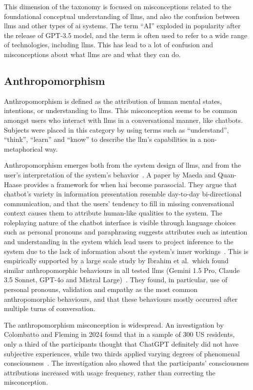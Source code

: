 This dimension of the taxonomy is focused on misconceptions related to the foundational conceptual understanding of \gls{llms}, and also the confusion between \gls{llms} and other types of \gls{ai} systems. The term ``AI'' exploded in popularity after the release of GPT-3.5 model, and the term is often used to refer to a wide range of technologies, including \gls{llms}. This has lead to a lot of confusion and misconceptions about what \gls{llms} are and what they can do.

\subsection{Anthropomorphism}\label{anthro}
Anthropomorphism is defined as the attribution of human mental states, intentions, or understanding to \gls{llms}. This misconception seems to be common amongst users who interact with \gls{llms} in a conversational manner, like chatbots. Subjects were placed in this category by using terms such as ``understand'', ``think'', ``learn'' and ``know'' to describe the \gls{llm}'s capabilities in a non-metaphorical way.

Anthropomorphism emerges both from the system design of \gls{llms}, and from the user's interpretation of the system's behavior\ \cite{maeda_when_2024}. A paper by Maeda and Quan-Haase provides a framework for when \gls{hai} become parasocial. They argue that chatbot's variety in information presentation resemble day-to-day bi-directional communication, and that the users' tendency to fill in missing conversational context causes them to attribute human-like qualities to the system. The roleplaying nature of the chatbot interface is visible through language choices such as personal pronouns and paraphrasing suggests attributes such as intention and understanding in the system which lead users to project inference to the system due to the lack of information about the system's inner workings\ \cite{maeda_when_2024}. 
This is empirically supported by a large scale study by Ibrahim et al.\ which found similar anthropomorphic behaviours in all tested \gls{llms} (Gemini 1.5 Pro, Claude 3.5 Sonnet, GPT-4o and Mistral Large)\ \cite{ibrahim_multi-turn_2026}. They found, in particular, use of personal pronouns, validation and empathy as the most common anthropomorphic behaviours, and that these behaviours mostly occurred after multiple turns of conversation.

The anthropomorphism misconception is widespread. An investigation by Colombatto and Fleming in 2024 found that in a sample of 300 US residents, only a third of the participants thought that ChatGPT definitely did not have subjective experiences, while two thirds applied varying degrees of phenomenal consciousness\ \cite{colombatto_folk_2024}. The investigation also showed that the participants' consciousness attributions increased with usage frequency, rather than correcting the misconception.

